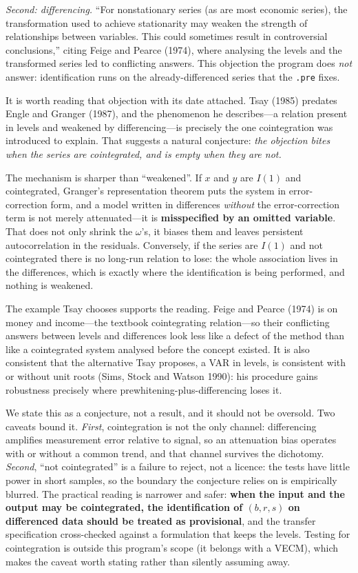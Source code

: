 \documentclass[11pt,a4paper]{article}
\theoremstyle{plain}
\theoremstyle{remark}
\begin{document}
\emph{Second: differencing.} ``For nonstationary series (as are most economic
series), the transformation used to achieve stationarity may weaken the strength
of relationships between variables. This could sometimes result in controversial
conclusions,'' citing Feige and Pearce (1974), where analysing the levels and the
transformed series led to conflicting answers. This objection the program does
\emph{not} answer: identification runs on the already-differenced series that the
\texttt{.pre} fixes.

It is worth reading that objection with its date attached. Tsay (1985) predates
Engle and Granger (1987), and the phenomenon he describes---a relation present in
levels and weakened by differencing---is precisely the one cointegration was
introduced to explain. That suggests a natural conjecture: \emph{the objection
bites when the series are cointegrated, and is empty when they are not.}

The mechanism is sharper than ``weakened''. If $x$ and $y$ are $I(1)$ and
cointegrated, Granger's representation theorem puts the system in
error-correction form, and a model written in differences \emph{without} the
error-correction term is not merely attenuated---it is \textbf{misspecified by an
omitted variable}. That does not only shrink the $\omega$'s, it biases them and
leaves persistent autocorrelation in the residuals. Conversely, if the series are
$I(1)$ and not cointegrated there is no long-run relation to lose: the whole
association lives in the differences, which is exactly where the identification
is being performed, and nothing is weakened.

The example Tsay chooses supports the reading. Feige and Pearce (1974) is on
money and income---the textbook cointegrating relation---so their conflicting
answers between levels and differences look less like a defect of the method than
like a cointegrated system analysed before the concept existed. It is also
consistent that the alternative Tsay proposes, a VAR in levels, is consistent
with or without unit roots (Sims, Stock and Watson 1990): his procedure gains
robustness precisely where prewhitening-plus-differencing loses it.

We state this as a conjecture, not a result, and it should not be oversold. Two
caveats bound it. \emph{First}, cointegration is not the only channel:
differencing amplifies measurement error relative to signal, so an attenuation
bias operates with or without a common trend, and that channel survives the
dichotomy. \emph{Second}, ``not cointegrated'' is a failure to reject, not a
licence: the tests have little power in short samples, so the boundary the
conjecture relies on is empirically blurred. The practical reading
is narrower and safer: \textbf{when the input and the output may be cointegrated,
the identification of $(b,r,s)$ on differenced data should be treated as
provisional}, and the transfer specification cross-checked against a formulation
that keeps the levels. Testing for cointegration is outside this program's scope
(it belongs with a VECM), which makes the caveat worth stating rather than
silently assuming away.
\end{document}
